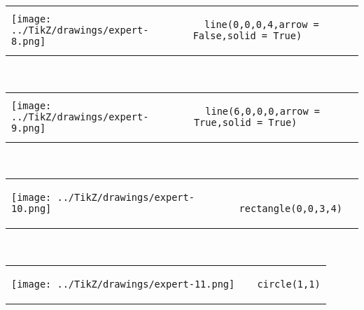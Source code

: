             \begin{tabular}{ll}
    \texttt{[image: ../TikZ/drawings/expert-8.png]}&
    
        \begin{minipage}{10cm}
        \begin{verbatim}
  line(0,0,0,4,arrow = False,solid = True)
        \end{verbatim}
\end{minipage}

    \end{tabular}        
            \\

            \begin{tabular}{ll}
    \texttt{[image: ../TikZ/drawings/expert-9.png]}&
    
        \begin{minipage}{10cm}
        \begin{verbatim}
  line(6,0,0,0,arrow = True,solid = True)
        \end{verbatim}
\end{minipage}

    \end{tabular}        
            \\

            \begin{tabular}{ll}
    \texttt{[image: ../TikZ/drawings/expert-10.png]}&
    
        \begin{minipage}{10cm}
        \begin{verbatim}
  rectangle(0,0,3,4)
        \end{verbatim}
\end{minipage}

    \end{tabular}        
            \\

            \begin{tabular}{ll}
    \texttt{[image: ../TikZ/drawings/expert-11.png]}&
    
        \begin{minipage}{10cm}
        \begin{verbatim}
  circle(1,1)
        \end{verbatim}
\end{minipage}

    \end{tabular}        
            \\

